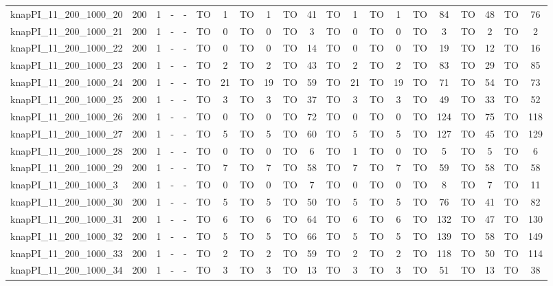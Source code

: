 \begin{sidewaystable}[!ht]
{\begin{tabular}{lcccccccccccccccccccc}
knapPI\_11\_200\_1000\_20 & 200 & 1 &  - &  - & TO & 1 & TO & 1 & TO & 41 & TO & 1 & TO & 1 & TO & 84 & TO & 48 & TO & 76 \\
knapPI\_11\_200\_1000\_21 & 200 & 1 &  - &  - & TO & 0 & TO & 0 & TO & 3 & TO & 0 & TO & 0 & TO & 3 & TO & 2 & TO & 2 \\
knapPI\_11\_200\_1000\_22 & 200 & 1 &  - &  - & TO & 0 & TO & 0 & TO & 14 & TO & 0 & TO & 0 & TO & 19 & TO & 12 & TO & 16 \\
knapPI\_11\_200\_1000\_23 & 200 & 1 &  - &  - & TO & 2 & TO & 2 & TO & 43 & TO & 2 & TO & 2 & TO & 83 & TO & 29 & TO & 85 \\
knapPI\_11\_200\_1000\_24 & 200 & 1 &  - &  - & TO & 21 & TO & 19 & TO & 59 & TO & 21 & TO & 19 & TO & 71 & TO & 54 & TO & 73 \\
knapPI\_11\_200\_1000\_25 & 200 & 1 &  - &  - & TO & 3 & TO & 3 & TO & 37 & TO & 3 & TO & 3 & TO & 49 & TO & 33 & TO & 52 \\
knapPI\_11\_200\_1000\_26 & 200 & 1 &  - &  - & TO & 0 & TO & 0 & TO & 72 & TO & 0 & TO & 0 & TO & 124 & TO & 75 & TO & 118 \\
knapPI\_11\_200\_1000\_27 & 200 & 1 &  - &  - & TO & 5 & TO & 5 & TO & 60 & TO & 5 & TO & 5 & TO & 127 & TO & 45 & TO & 129 \\
knapPI\_11\_200\_1000\_28 & 200 & 1 &  - &  - & TO & 0 & TO & 0 & TO & 6 & TO & 1 & TO & 0 & TO & 5 & TO & 5 & TO & 6 \\
knapPI\_11\_200\_1000\_29 & 200 & 1 &  - &  - & TO & 7 & TO & 7 & TO & 58 & TO & 7 & TO & 7 & TO & 59 & TO & 58 & TO & 58 \\
knapPI\_11\_200\_1000\_3 & 200 & 1 &  - &  - & TO & 0 & TO & 0 & TO & 7 & TO & 0 & TO & 0 & TO & 8 & TO & 7 & TO & 11 \\
knapPI\_11\_200\_1000\_30 & 200 & 1 &  - &  - & TO & 5 & TO & 5 & TO & 50 & TO & 5 & TO & 5 & TO & 76 & TO & 41 & TO & 82 \\
knapPI\_11\_200\_1000\_31 & 200 & 1 &  - &  - & TO & 6 & TO & 6 & TO & 64 & TO & 6 & TO & 6 & TO & 132 & TO & 47 & TO & 130 \\
knapPI\_11\_200\_1000\_32 & 200 & 1 &  - &  - & TO & 5 & TO & 5 & TO & 66 & TO & 5 & TO & 5 & TO & 139 & TO & 58 & TO & 149 \\
knapPI\_11\_200\_1000\_33 & 200 & 1 &  - &  - & TO & 2 & TO & 2 & TO & 59 & TO & 2 & TO & 2 & TO & 118 & TO & 50 & TO & 114 \\
knapPI\_11\_200\_1000\_34 & 200 & 1 &  - &  - & TO & 3 & TO & 3 & TO & 13 & TO & 3 & TO & 3 & TO & 51 & TO & 13 & TO & 38 \\

\end{tabular}}
\end{sidewaystable}
